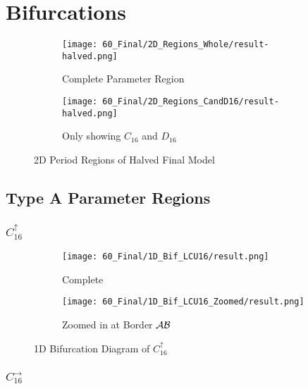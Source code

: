 \section{Bifurcations}


\begin{figure}
    \centering
    \begin{subfigure}{0.4\textwidth}
        \centering
        \texttt{[image: 60\_Final/2D\_Regions\_Whole/result-halved.png]}
        \caption{Complete Parameter Region}
        \label{fig:final.regions.whole.halved}
    \end{subfigure}
    \begin{subfigure}{0.4\textwidth}
        \centering
        \texttt{[image: 60\_Final/2D\_Regions\_CandD16/result-halved.png]}
        \caption{Only showing $C_{16}$ and $D_{16}$}
        \label{fig:final.regions.CandD16.halved}
    \end{subfigure}
    \caption{2D Period Regions of Halved Final Model}
\end{figure}


\subsection{Type A Parameter Regions}

\subsubsection{$C_{16}^\uparrow$}

\begin{figure}
    \centering
    \begin{subfigure}{0.4\textwidth}
        \centering
        \texttt{[image: 60\_Final/1D\_Bif\_LCU16/result.png]}
        \caption{Complete}
        \label{fig:bifurcation.C.up}
    \end{subfigure}
    \begin{subfigure}{0.4\textwidth}
        \centering
        \texttt{[image: 60\_Final/1D\_Bif\_LCU16\_Zoomed/result.png]}
        \caption{Zoomed in at Border $\mathcal{A}\mathcal{B}$}
        \label{fig:bifurcation.C.up.zoomed}
    \end{subfigure}
    \caption{1D Bifurcation Diagram of $C_{16}^\uparrow$}
\end{figure}

\subsubsection{$C_{16}^\rightarrow$}

